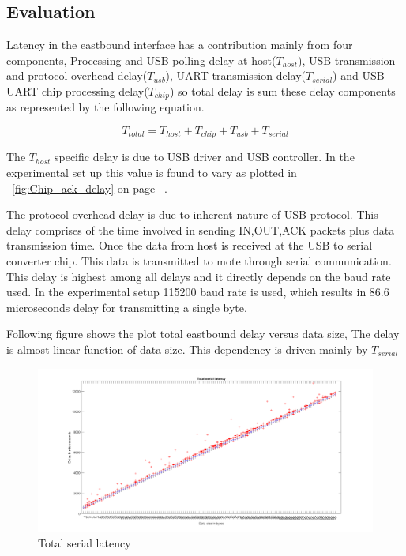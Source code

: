 \subsection{Evaluation}
Latency in the eastbound interface has a contribution mainly from four components, Processing and USB polling delay at host($T_{host}$), USB transmission and protocol overhead delay($T_{usb}$), UART transmission delay($T_{serial}$) and USB-UART chip processing delay($T_{chip}$) so total delay is sum these delay components as represented by the following equation.

\begin{equation}
T_{total} = T_{host} + T_{chip} + T_{usb} + T_{serial}
\end{equation}

The $T_{host}$ specific delay is due to USB driver and USB controller. In the experimental set up this value is found to vary as plotted in ~\ref{fig:Chip_ack_delay} on page ~\pageref{fig:Chip_ack_delay}.


The protocol overhead delay is due to inherent nature of USB protocol.
This delay comprises of the time involved in sending IN,OUT,ACK packets plus data transmission time.
Once the data from host is received at the USB to serial converter chip. This data is transmitted to mote through serial communication. This delay is highest among all delays and it directly depends on the baud rate used.
In the experimental setup 115200 baud rate is used, which results in 86.6 microseconds delay for transmitting a single byte.

Following figure shows the plot total eastbound delay versus data size, The delay is almost linear function of data size. This dependency is driven mainly by $T_{serial}$

\begin{figure}[H]
	\includegraphics[width=1\textwidth,center]{untitled3.png}
	\caption{Total serial latency}
	\label{fig:Total_serial_latency}
\end{figure}


